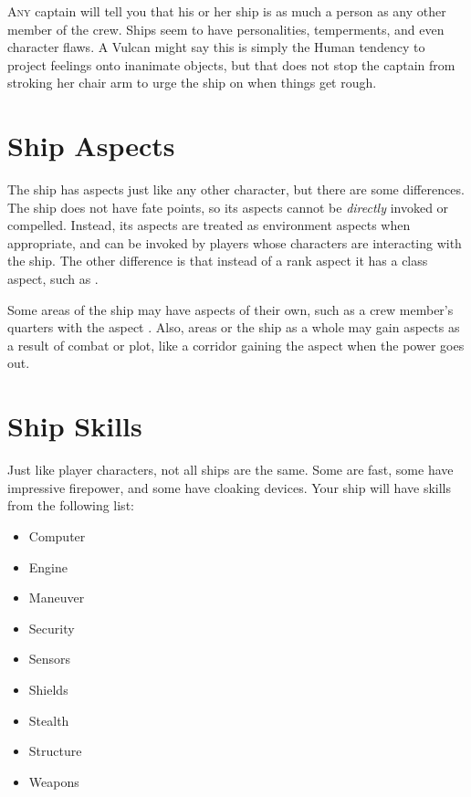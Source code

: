 \documentclass[12pt,titlepage,openany]{book}
\begin{document}
\lettrine[lines=1]{A}{ny} captain will tell you that his or her ship is as much
a person as any other member of the crew. Ships seem to have personalities,
temperments, and even character flaws. A Vulcan might say this is simply the
Human tendency to project feelings onto inanimate objects, but that does not
stop the captain from stroking her chair arm to urge the ship on when things
get rough.

\section{Ship Aspects}\label{sec:ship-aspects}

The ship has aspects just like any other character, but there are some
differences. The ship does not have fate points, so its aspects cannot be
\emph{directly} invoked or compelled. Instead, its aspects are treated as
environment aspects when appropriate, and can be invoked by players whose
characters are interacting with the ship. The other difference is that instead
of a rank aspect it has a class aspect, such as .

Some areas of the ship may have aspects of their own, such as a crew member's
quarters with the aspect . Also, areas or the ship
as a whole may gain aspects as a result of combat or plot, like a corridor
gaining the aspect  when the power goes out.

\section{Ship Skills}\label{sec:ship-skills}

Just like player characters, not all ships are the same. Some are fast, some
have impressive firepower, and some have cloaking devices. Your ship will have
skills from the following list:

\begin{multicols}{3}
    \raggedcolumns
    \begin{itemize}
        \item Computer
        \item Engine
        \item Maneuver
        \item Security
        \item Sensors
        \item Shields
        \item Stealth
        \item Structure
        \item Weapons
    \end{itemize}
\end{multicols}
\end{document}
